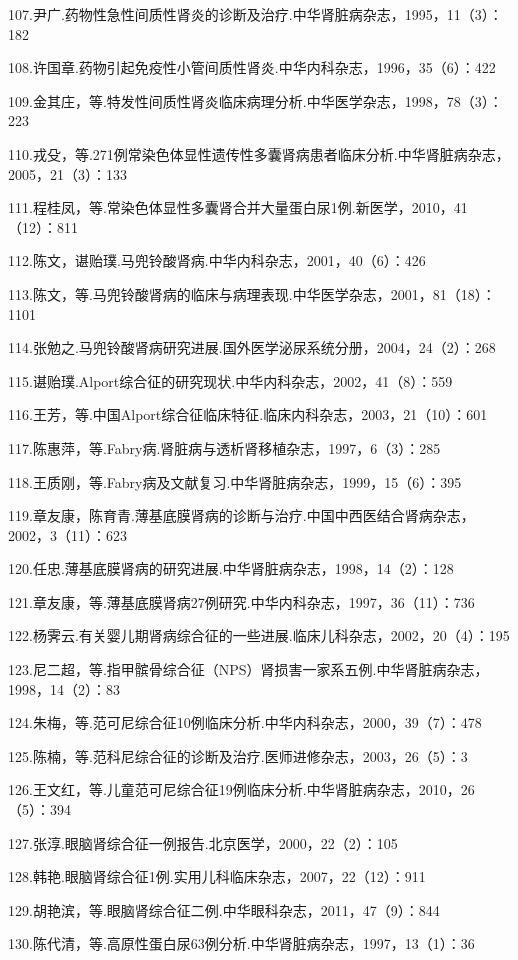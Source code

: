 107.尹广.药物性急性间质性肾炎的诊断及治疗.中华肾脏病杂志，1995，11（3）：182

108.许国章.药物引起免疫性小管间质性肾炎.中华内科杂志，1996，35（6）：422

109.金其庄，等.特发性间质性肾炎临床病理分析.中华医学杂志，1998，78（3）：223

110.戎殳，等.271例常染色体显性遗传性多囊肾病患者临床分析.中华肾脏病杂志，2005，21（3）：133

111.程桂凤，等.常染色体显性多囊肾合并大量蛋白尿1例.新医学，2010，41（12）：811

112.陈文，谌贻璞.马兜铃酸肾病.中华内科杂志，2001，40（6）：426

113.陈文，等.马兜铃酸肾病的临床与病理表现.中华医学杂志，2001，81（18）：1101

114.张勉之.马兜铃酸肾病研究进展.国外医学泌尿系统分册，2004，24（2）：268

115.谌贻璞.Alport综合征的研究现状.中华内科杂志，2002，41（8）：559

116.王芳，等.中国Alport综合征临床特征.临床内科杂志，2003，21（10）：601

117.陈惠萍，等.Fabry病.肾脏病与透析肾移植杂志，1997，6（3）：285

118.王质刚，等.Fabry病及文献复习.中华肾脏病杂志，1999，15（6）：395

119.章友康，陈育青.薄基底膜肾病的诊断与治疗.中国中西医结合肾病杂志，2002，3（11）：623

120.任忠.薄基底膜肾病的研究进展.中华肾脏病杂志，1998，14（2）：128

121.章友康，等.薄基底膜肾病27例研究.中华内科杂志，1997，36（11）：736

122.杨霁云.有关婴儿期肾病综合征的一些进展.临床儿科杂志，2002，20（4）：195

123.尼二超，等.指甲髌骨综合征（NPS）肾损害一家系五例.中华肾脏病杂志，1998，14（2）：83

124.朱梅，等.范可尼综合征10例临床分析.中华内科杂志，2000，39（7）：478

125.陈楠，等.范科尼综合征的诊断及治疗.医师进修杂志，2003，26（5）：3

126.王文红，等.儿童范可尼综合征19例临床分析.中华肾脏病杂志，2010，26（5）：394

127.张淳.眼脑肾综合征一例报告.北京医学，2000，22（2）：105

128.韩艳.眼脑肾综合征1例.实用儿科临床杂志，2007，22（12）：911

129.胡艳滨，等.眼脑肾综合征二例.中华眼科杂志，2011，47（9）：844

130.陈代清，等.高原性蛋白尿63例分析.中华肾脏病杂志，1997，13（1）：36

\protect\hypertarget{text00297.html}{}{}

